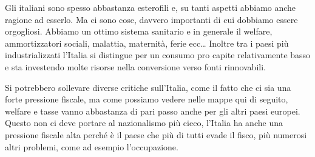 \documentclass[12pt]{book} %
\begin{document}
Gli italiani sono spesso abbastanza esterofili e, su tanti aspetti abbiamo anche ragione ad esserlo. Ma ci sono cose, davvero
importanti di cui dobbiamo essere orgogliosi. Abbiamo un ottimo sistema sanitario e in generale il
welfare, ammortizzatori
sociali, malattia, maternità, ferie ecc… Inoltre tra i paesi più industrializzati l'Italia si distingue per un consumo pro capite relativamente basso e sta investendo molte risorse nella conversione verso fonti rinnovabili.

Si potrebbero sollevare diverse critiche sull'Italia, come il fatto che ci sia una forte pressione
fiscale, ma come possiamo vedere nelle mappe qui di seguito, welfare e tasse vanno abbastanza di pari passo anche per gli altri paesi europei. 
Questo non ci deve portare al nazionalismo più cieco, l'Italia ha anche una pressione fiscale alta perché è il paese che più di tutti evade il fisco, più numerosi altri problemi, come ad esempio l'occupazione.
\end{document}
